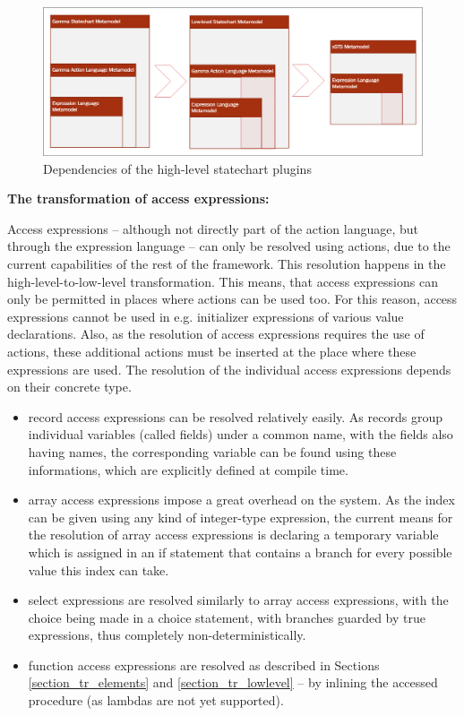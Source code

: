 \begin{figure}[H]
	\centering
	\includegraphics[width=150mm, keepaspectratio]{figures/GammaTransformationComponent.png}
	\caption{Dependencies of the high-level statechart plugins}
	\label{fig:gammaTransformationComponent}
\end{figure}

\textbf{The transformation of access expressions:}

Access expressions -- although not directly part of the action language, but through the expression language -- can only be resolved using actions, due to the current capabilities of the rest of the framework. This resolution happens in the high-level-to-low-level transformation. This means, that access expressions can only be permitted in places where actions can be used too. For this reason, access expressions cannot be used in e.g. initializer expressions of various value declarations. Also, as the resolution of access expressions requires the use of actions, these additional actions must be inserted at the place where these expressions are used. The resolution of the individual access expressions depends on their concrete type.
\begin{itemize}
	\item record access expressions can be resolved relatively easily. As records group individual variables (called fields) under a common name, with the fields also having names, the corresponding variable can be found using these informations, which are explicitly defined at compile time.  
	\item array access expressions impose a great overhead on the system. As the index can be given using any kind of integer-type expression, the current means for the resolution of array access expressions is declaring a temporary variable which is assigned in an if statement that contains a branch for every possible value this index can take.
	\item select expressions are resolved similarly to array access expressions, with the choice being made in a choice statement, with branches guarded by true expressions, thus completely non-deterministically.
	\item function access expressions are resolved as described in Sections \ref{section_tr_elements} and \ref{section_tr_lowlevel} -- by inlining the accessed procedure (as lambdas are not yet supported).
\end{itemize} 
